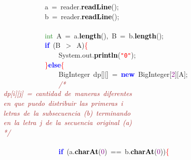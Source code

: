 {{\mbox{}\ \ \ \ \ \ \ \ \ \ \ \ a\ \textcolor{BrickRed}{=}\ reader\textcolor{BrickRed}{.}\textbf{\textcolor{Black}{readLine}}\textcolor{BrickRed}{();} \\
\mbox{}\ \ \ \ \ \ \ \ \ \ \ \ b\ \textcolor{BrickRed}{=}\ reader\textcolor{BrickRed}{.}\textbf{\textcolor{Black}{readLine}}\textcolor{BrickRed}{();} \\
\mbox{}\  \\
\mbox{}\ \ \ \ \ \ \ \ \ \ \ \ \textcolor{ForestGreen}{int}\ A\ \textcolor{BrickRed}{=}\ a\textcolor{BrickRed}{.}\textbf{\textcolor{Black}{length}}\textcolor{BrickRed}{(),}\ B\ \textcolor{BrickRed}{=}\ b\textcolor{BrickRed}{.}\textbf{\textcolor{Black}{length}}\textcolor{BrickRed}{();} \\
\mbox{}\ \ \ \ \ \ \ \ \ \ \ \ \textbf{\textcolor{Blue}{if}}\ \textcolor{BrickRed}{(}B\ \textcolor{BrickRed}{$>$}\ A\textcolor{BrickRed}{)}\textcolor{Red}{\{} \\
\mbox{}\ \ \ \ \ \ \ \ \ \ \ \ \ \ \ \ System\textcolor{BrickRed}{.}out\textcolor{BrickRed}{.}\textbf{\textcolor{Black}{println}}\textcolor{BrickRed}{(}\texttt{\textcolor{Red}{"{}0"{}}}\textcolor{BrickRed}{);} \\
\mbox{}\ \ \ \ \ \ \ \ \ \ \ \ \textcolor{Red}{\}}\textbf{\textcolor{Blue}{else}}\textcolor{Red}{\{} \\
\mbox{}\ \ \ \ \ \ \ \ \ \ \ \ \ \ \ \ BigInteger\ dp\textcolor{BrickRed}{[][]}\ \textcolor{BrickRed}{=}\ \textbf{\textcolor{Blue}{new}}\ BigInteger\textcolor{BrickRed}{[}\textcolor{Purple}{2}\textcolor{BrickRed}{][}A\textcolor{BrickRed}{];} \\
\mbox{}\ \ \ \ \ \ \ \ \ \ \ \ \ \ \ \ \textit{\textcolor{Brown}{/*}} \\
\mbox{}\textit{\textcolor{Brown}{dp[i][j]\ =\ cantidad\ de\ maneras\ diferentes}} \\
\mbox{}\textit{\textcolor{Brown}{en\ que\ puedo\ distribuir\ las\ primeras\ i}} \\
\mbox{}\textit{\textcolor{Brown}{letras\ de\ la\ subsecuencia\ (b)\ terminando}} \\
\mbox{}\textit{\textcolor{Brown}{en\ la\ letra\ j\ de\ la\ secuencia\ original\ (a)}} \\
\mbox{}\textit{\textcolor{Brown}{*/}} \\
\mbox{}\  \\
\mbox{}\ \ \ \ \ \ \ \ \ \ \ \ \ \ \ \ \textbf{\textcolor{Blue}{if}}\ \textcolor{BrickRed}{(}a\textcolor{BrickRed}{.}\textbf{\textcolor{Black}{charAt}}\textcolor{BrickRed}{(}\textcolor{Purple}{0}\textcolor{BrickRed}{)}\ \textcolor{BrickRed}{==}\ b\textcolor{BrickRed}{.}\textbf{\textcolor{Black}{charAt}}\textcolor{BrickRed}{(}\textcolor{Purple}{0}\textcolor{BrickRed}{))}\textcolor{Red}{\{} \\
}}
